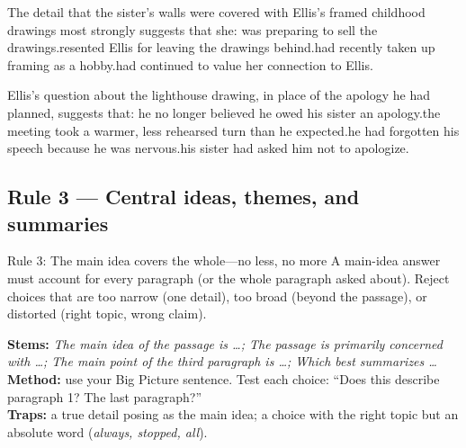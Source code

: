 \documentclass[11pt]{article}
\begin{document}
{The detail that the sister's walls were covered with Ellis's framed childhood drawings most strongly suggests that she:}
{was preparing to sell the drawings.}{resented Ellis for leaving the drawings behind.}{had recently taken up framing as a hobby.}{had continued to value her connection to Ellis.}

{Ellis's question about the lighthouse drawing, in place of the apology he had planned, suggests that:}
{he no longer believed he owed his sister an apology.}{the meeting took a warmer, less rehearsed turn than he expected.}{he had forgotten his speech because he was nervous.}{his sister had asked him not to apologize.}

\subsection{Rule 3 --- Central ideas, themes, and summaries}
\begin{rulebox}{Rule 3: The main idea covers the whole---no less, no more}
A main-idea answer must account for every paragraph (or the whole paragraph asked about). Reject choices that are too narrow (one detail), too broad (beyond the passage), or distorted (right topic, wrong claim).
\end{rulebox}
\textbf{Stems:} \emph{The main idea of the passage is \dots; The passage is primarily concerned with \dots; The main point of the third paragraph is \dots; Which best summarizes \dots}\\
\textbf{Method:} use your Big Picture sentence. Test each choice: ``Does this describe paragraph 1? The last paragraph?''\\
\textbf{Traps:} a true detail posing as the main idea; a choice with the right topic but an absolute word (\emph{always, stopped, all}).
\end{document}
